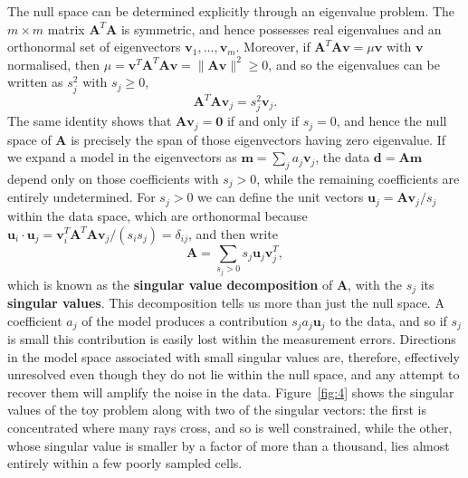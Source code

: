 The null space can be determined explicitly through an eigenvalue problem. The $m\times m$ matrix $\mathbf{A}^{T}\mathbf{A}$ 
is symmetric, and hence possesses real eigenvalues and an orthonormal set of eigenvectors $\mathbf{v}_{1},\dots,\mathbf{v}_{m}$. 
Moreover, if $\mathbf{A}^{T}\mathbf{A}\mathbf{v}=\mu\mathbf{v}$ with $\mathbf{v}$ normalised, then 
$\mu=\mathbf{v}^{T}\mathbf{A}^{T}\mathbf{A}\mathbf{v}=\|\mathbf{A}\mathbf{v}\|^{2}\ge0$, and so the eigenvalues can be written 
as $s_{j}^{2}$ with $s_{j}\ge0$,
\begin{equation}
    \mathbf{A}^{T}\mathbf{A}\mathbf{v}_{j}=s_{j}^{2}\mathbf{v}_{j}.
    \label{eq:16}
\end{equation}
The same identity shows that $\mathbf{A}\mathbf{v}_{j}=\mathbf{0}$ if and only if $s_{j}=0$, and hence the null space of 
$\mathbf{A}$ is precisely the span of those eigenvectors having zero eigenvalue. If we expand a model in the eigenvectors 
as $\mathbf{m}=\sum_{j}a_{j}\mathbf{v}_{j}$, the data $\mathbf{d}=\mathbf{A}\mathbf{m}$ depend only on those coefficients with 
$s_{j}>0$, while the remaining coefficients are entirely undetermined. For $s_{j}>0$ we can define the unit vectors 
$\mathbf{u}_{j}=\mathbf{A}\mathbf{v}_{j}/s_{j}$ within the data space, which are orthonormal because 
$\mathbf{u}_{i}\cdot\mathbf{u}_{j}=\mathbf{v}_{i}^{T}\mathbf{A}^{T}\mathbf{A}\mathbf{v}_{j}/(s_{i}s_{j})=\delta_{ij}$, and then write
\begin{equation}
    \mathbf{A}=\sum_{s_{j}>0}s_{j}\mathbf{u}_{j}\mathbf{v}_{j}^{T},
    \label{eq:17}
\end{equation}
which is known as the \textbf{singular value decomposition} of $\mathbf{A}$, with the $s_{j}$ its \textbf{singular values}. 
This decomposition tells us more than just the null space. A coefficient $a_{j}$ of the model produces a contribution 
$s_{j}a_{j}\mathbf{u}_{j}$ to the data, and so if $s_{j}$ is small this contribution is easily lost within the measurement 
errors. Directions in the model space associated with small singular values are, therefore, effectively unresolved even 
though they do not lie within the null space, and any attempt to recover them will amplify the noise in the data. 
Figure~\ref{fig:4} shows the singular values of the toy problem along with two of the singular vectors: the first is 
concentrated where many rays cross, and so is well constrained, while the other, whose singular value is smaller by a factor 
of more than a thousand, lies almost entirely within a few poorly sampled cells.

